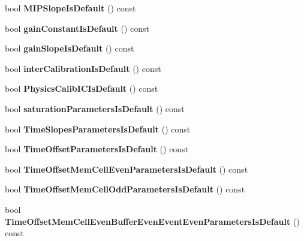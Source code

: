 \begin{DoxyCompactItemize}
\item 
bool {\bfseries M\-I\-P\-Slope\-Is\-Default} () const \label{classCALICE_1_1Ahc2CalibrationStatusBits_a50b4fe7b0aa00e0483bb59a2d99af59f}

\item 
bool {\bfseries gain\-Constant\-Is\-Default} () const \label{classCALICE_1_1Ahc2CalibrationStatusBits_a7098ed6fd937b62c040c929eb40682d1}

\item 
bool {\bfseries gain\-Slope\-Is\-Default} () const \label{classCALICE_1_1Ahc2CalibrationStatusBits_a4bb22c8217cdf4b6b0ac9c181aedb3a3}

\item 
bool {\bfseries inter\-Calibration\-Is\-Default} () const \label{classCALICE_1_1Ahc2CalibrationStatusBits_aa90445a6de7f1f35b3e8e1ffe34299a9}

\item 
bool {\bfseries Physics\-Calib\-I\-C\-Is\-Default} () const \label{classCALICE_1_1Ahc2CalibrationStatusBits_a5cee89c4a70a9e196bae203818920bc4}

\item 
bool {\bfseries saturation\-Parameters\-Is\-Default} () const \label{classCALICE_1_1Ahc2CalibrationStatusBits_a838584c262cfbccea7969744e968e563}

\item 
bool {\bfseries Time\-Slopes\-Parameters\-Is\-Default} () const \label{classCALICE_1_1Ahc2CalibrationStatusBits_a84bb230b2a5a83cc168640aef3675027}

\item 
bool {\bfseries Time\-Offset\-Parameters\-Is\-Default} () const \label{classCALICE_1_1Ahc2CalibrationStatusBits_a6018de75f0dbf2df18d67e8e66fea6c0}

\item 
bool {\bfseries Time\-Offset\-Mem\-Cell\-Even\-Parameters\-Is\-Default} () const \label{classCALICE_1_1Ahc2CalibrationStatusBits_af303d33a62599ba69b0ceb200fd79636}

\item 
bool {\bfseries Time\-Offset\-Mem\-Cell\-Odd\-Parameters\-Is\-Default} () const \label{classCALICE_1_1Ahc2CalibrationStatusBits_a1288fac47b6d8e8af90e7734611abfb2}

\item 
bool {\bfseries Time\-Offset\-Mem\-Cell\-Even\-Buffer\-Even\-Event\-Even\-Parameters\-Is\-Default} () const \label{classCALICE_1_1Ahc2CalibrationStatusBits_abad8297ffd47204d37da102e8cdf0544}


\end{DoxyCompactItemize}
